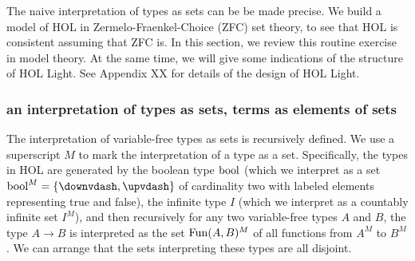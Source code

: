 \documentclass[brochure,english,12pt]{bourbaki}
\theoremstyle{plain}
\begin{document}
The naive interpretation of types as sets can be be made precise.
We build a model of HOL in Zermelo-Fraenkel-Choice (ZFC) set theory, to see that HOL is consistent assuming that ZFC is.
In this section, we review this routine exercise in model theory.  
At the same time, we will give some indications of the structure of HOL Light.
See Appendix XX for details of the design of HOL Light.



\subsubsection{an interpretation of types as sets, terms as elements of sets}

The interpretation
of variable-free types as sets is recursively defined.  We use a superscript $M$ to mark the interpretation
of a type as a set.  Specifically, the types in HOL are generated by
the boolean type ${\operatorname{bool}}$ (which we interpret as a set $\bool^M=\{\downvdash ,\upvdash \}$ 
of cardinality two with labeled elements representing true and false),
the infinite type $I$ (which we interpret as a countably infinite set $I^M$),
and then recursively for any two variable-free types $A$ and $B$, the type $A\to B$ is interpreted
as the set ${\operatorname{Fun}}(A,B)^M$ of all functions from $A^M$ to $B^M$.
We can arrange that the sets interpreting these types are all disjoint.

\end{document}
